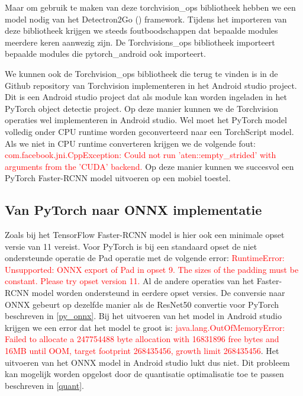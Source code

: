 Maar om gebruik te maken van deze torchvision\_ops bibliotheek hebben we een model nodig van het Detectron2Go (\cite{Facebook_detectron2_2021}) framework.
Tijdens het importeren van deze bibliotheek krijgen we steeds foutboodschappen dat bepaalde modules meerdere keren aanwezig zijn.
De Torchvisions\_ops bibliotheek importeert bepaalde modules die pytorch\_android ook importeert.

We kunnen ook de Torchvision\_ops bibliotheek die terug te vinden is in de Github repository van Torchvision implementeren in het Android studio project.
Dit is een Android studio project dat als module kan worden ingeladen in het PyTorch object detectie project.
Op deze manier kunnen we de Torchvision operaties wel implementeren in Android studio.
Wel moet het PyTorch model volledig onder CPU runtime worden geconverteerd naar een TorchScript model.
Als we niet in CPU runtime converteren krijgen we de volgende fout: \textcolor{red}{com.facebook.jni.CppException: Could not run 'aten::empty\_strided' with arguments from the 'CUDA' backend.}
\newline
Op deze manier kunnen we succesvol een PyTorch Faster-RCNN model uitvoeren op een mobiel toestel.




\subsection{Van PyTorch naar ONNX implementatie}
Zoals bij het TensorFlow Faster-RCNN model is hier ook een minimale opset versie van 11 vereist.
Voor PyTorch is bij een standaard opset de niet ondersteunde operatie de Pad operatie met de volgende error: 
\textcolor{red}{RuntimeError: Unsupported: ONNX export of Pad in opset 9. The sizes of the padding must be constant. Please try opset version 11.}
Al de andere operaties van het Faster-RCNN model worden ondersteund in eerdere opset versies.
De conversie naar ONNX gebeurt op dezelfde manier als de ResNet50 convertie voor PyTorch beschreven in \ref{py_onnx}.
Bij het uitvoeren van het model in Android studio krijgen we een error dat het model te groot is:
\textcolor{red}{java.lang.OutOfMemoryError: Failed to allocate a 247754488 byte allocation with 16831896 free bytes and 16MB until OOM, target footprint 268435456, growth limit 268435456}.
Het uitvoeren van het ONNX model in Android studio lukt dus niet.
Dit probleem kan mogelijk worden opgelost door de quantisatie optimalisatie toe te passen beschreven in \ref{quant}.

